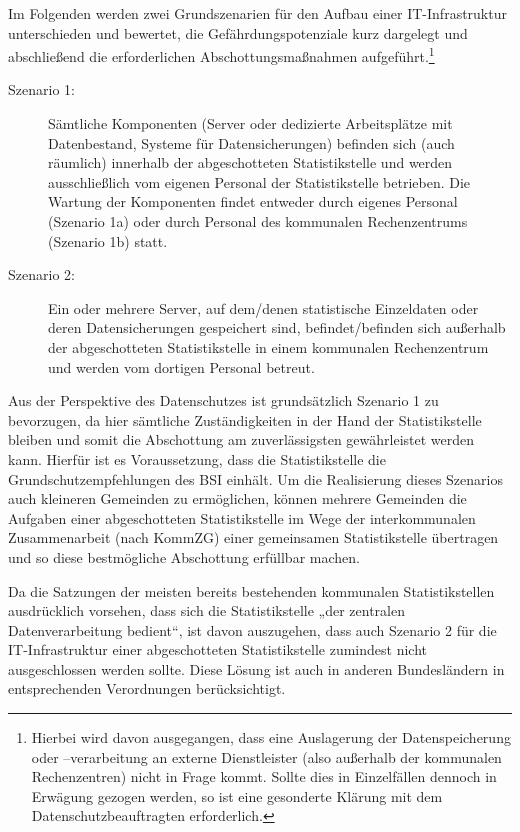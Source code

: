 Im Folgenden werden zwei Grundszenarien für den Aufbau einer IT-Infrastruktur unterschieden und bewertet, die Gefährdungspotenziale kurz dargelegt und abschließend die erforderlichen Abschottungsmaßnahmen aufgeführt.\footnote{Hierbei wird davon ausgegangen, dass eine Auslagerung der Datenspeicherung oder –verarbeitung an externe Dienstleister (also außerhalb der kommunalen Rechenzentren) nicht in Frage kommt. Sollte dies in Einzelfällen dennoch in Erwägung gezogen werden, so ist eine gesonderte Klärung mit dem Datenschutzbeauftragten erforderlich.}
    \begin{description}
        \item[Szenario 1:] Sämtliche Komponenten (Server oder dedizierte Arbeitsplätze mit Datenbestand, Systeme für Datensicherungen) befinden sich (auch räumlich) innerhalb der abgeschotteten Statistikstelle und werden ausschließlich vom eigenen Personal der Statistikstelle betrieben. Die Wartung der Komponenten findet entweder durch eigenes Personal (Szenario 1a) oder durch Personal des kommunalen Rechenzentrums (Szenario 1b) statt. 
        \item[Szenario 2:] Ein oder mehrere Server, auf dem/denen statistische Einzeldaten oder deren Datensicherungen gespeichert sind, befindet/befinden sich außerhalb der abgeschotteten Statistikstelle in einem kommunalen Rechenzentrum und werden vom dortigen Personal betreut.
    \end{description}
Aus der Perspektive des Datenschutzes ist grundsätzlich Szenario 1 zu bevorzugen, da hier sämtliche Zuständigkeiten in der Hand der Statistikstelle bleiben und somit die Abschottung am zuverlässigsten gewährleistet werden kann. Hierfür ist es Voraussetzung, dass die Statistikstelle die Grundschutzempfehlungen des BSI einhält. Um die Realisierung dieses Szenarios auch kleineren Gemeinden zu ermöglichen, können mehrere Gemeinden die Aufgaben einer abgeschotteten Statistikstelle im Wege der interkommunalen Zusammenarbeit (nach KommZG) einer gemeinsamen Statistikstelle übertragen und so diese bestmögliche Abschottung erfüllbar machen.

Da die Satzungen der meisten bereits bestehenden kommunalen Statistikstellen ausdrücklich vorsehen, dass sich die Statistikstelle „der zentralen Datenverarbeitung bedient“, ist davon auszugehen, dass auch Szenario 2 für die IT-Infrastruktur einer abgeschotteten Statistikstelle zumindest nicht ausgeschlossen werden sollte. Diese Lösung ist auch in anderen Bundesländern in entsprechenden Verordnungen berücksichtigt.

